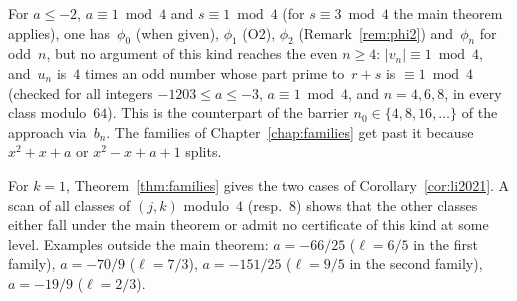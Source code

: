 \begin{remark}
  \label{rem:even}
  For $a \le -2$, $a \equiv 1 \bmod 4$ and $s \equiv 1 \bmod 4$ (for $s \equiv 3 \bmod 4$ the
  main theorem applies), one has~$\phi_0$ (when given), $\phi_1$ (O2), $\phi_2$
  (Remark~\ref{rem:phi2}) and~$\phi_n$ for odd~$n$, but no argument of this kind reaches the
  even $n \ge 4$: $|v_n| \equiv 1 \bmod 4$, and~$u_n$ is~$4$ times an odd number whose part prime
  to~$r + s$ is $\equiv 1 \bmod 4$ (checked for all integers $-1203 \le a \le -3$,
  $a \equiv 1 \bmod 4$, and $n = 4, 6, 8$, in every class modulo~$64$). This is the counterpart of
  the barrier $n_0 \in \{4, 8, 16, \dots\}$ of the approach via~$b_n$. The families of
  Chapter~\ref{chap:families} get past it because $x^2 + x + a$ or $x^2 - x + a + 1$ splits.
\end{remark}

\begin{remark}
  For $k = 1$, Theorem~\ref{thm:families} gives the two cases of Corollary~\ref{cor:li2021}. A
  scan of all classes of $(j, k)$ modulo~$4$ (resp.\ $8$) shows that the other classes either
  fall under the main theorem or admit no certificate of this kind at some level. Examples
  outside the main theorem: $a = -66/25$ ($\ell = 6/5$ in the first family), $a = -70/9$
  ($\ell = 7/3$), $a = -151/25$ ($\ell = 9/5$ in the second family), $a = -19/9$ ($\ell = 2/3$).
\end{remark}
